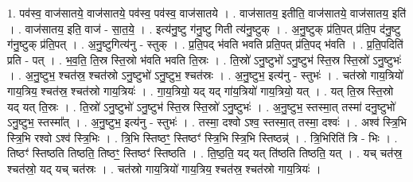 \documentclass[17pt]{extarticle}
\begin{document}
1. पव॑स्व॒ वाज॑सातये॒ वाज॑सातये॒ पव॑स्व॒ पव॑स्व॒ वाज॑सातये । . वाज॑सातय॒ इतीति॒ वाज॑सातये॒ वाज॑सातय॒ इति॑ । . वाज॑सातय॒ इति॒ वाज॑ - सा॒त॒ये॒ । . इत्य॑नु॒ष्टु ग॑नु॒ष्टु गिती त्य॑नु॒ष्टुक् । . अ॒नु॒ष्टुक् प्र॑ति॒पत् प्र॑ति॒प द॑नु॒ष्टु ग॑नु॒ष्टुक् प्र॑ति॒पत् । . अ॒नु॒ष्टुगित्य॑नु - स्तुक् । . प्र॒ति॒पद् भ॑वति भवति प्रति॒पत् प्र॑ति॒पद् भ॑वति । . प्र॒ति॒पदिति॑ प्रति - पत् । . भ॒व॒ति॒ ति॒स्र स्ति॒स्रो भ॑वति भवति ति॒स्रः । . ति॒स्रो॑ ऽनु॒ष्टुभो॑ ऽनु॒ष्टुभ॑ स्ति॒स्र स्ति॒स्रो॑ ऽनु॒ष्टुभः॑ । . अ॒नु॒ष्टुभ॒ श्चत॑स्र॒ श्चत॑स्रो ऽनु॒ष्टुभो॑ ऽनु॒ष्टुभ॒ श्चत॑स्रः । . अ॒नु॒ष्टुभ॒ इत्य॑नु - स्तुभः॑ । . चत॑स्रो गाय॒त्रियो॑ गाय॒त्रिय॒ श्चत॑स्र॒ श्चत॑स्रो गाय॒त्रियः॑ । . गा॒य॒त्रियो॒ यद् यद् गा॑य॒त्रियो॑ गाय॒त्रियो॒ यत् । . यत् ति॒स्र स्ति॒स्रो यद् यत् ति॒स्रः । . ति॒स्रो॑ ऽनु॒ष्टुभो॑ ऽनु॒ष्टुभ॑ स्ति॒स्र स्ति॒स्रो॑ ऽनु॒ष्टुभः॑ । . अ॒नु॒ष्टुभ॒ स्तस्मा॒त् तस्मा॑ दनु॒ष्टुभो॑ ऽनु॒ष्टुभ॒ स्तस्मा᳚त् । . अ॒नु॒ष्टुभ॒ इत्य॑नु - स्तुभः॑ । . तस्मा॒ दश्वो ऽश्व॒ स्तस्मा॒त् तस्मा॒ दश्वः॑ । . अश्व॑ स्त्रि॒भि स्त्रि॒भि रश्वो ऽश्व॑ स्त्रि॒भिः । . त्रि॒भि स्तिष्ठꣳ॒॒ स्तिष्ठꣳ॑ स्त्रि॒भि स्त्रि॒भि स्तिष्ठन्न्॑ । . त्रि॒भिरिति॑ त्रि - भिः । . तिष्ठꣳ॑ स्तिष्ठति तिष्ठति॒ तिष्ठꣳ॒॒ स्तिष्ठꣳ॑ स्तिष्ठति । . ति॒ष्ठ॒ति॒ यद् यत् ति॑ष्ठति तिष्ठति॒ यत् । . यच् चत॑स्र॒ श्चत॑स्रो॒ यद् यच् चत॑स्रः । . चत॑स्रो गाय॒त्रियो॑ गाय॒त्रिय॒ श्चत॑स्र॒ श्चत॑स्रो गाय॒त्रियः॑ । \newline
\end{document}
